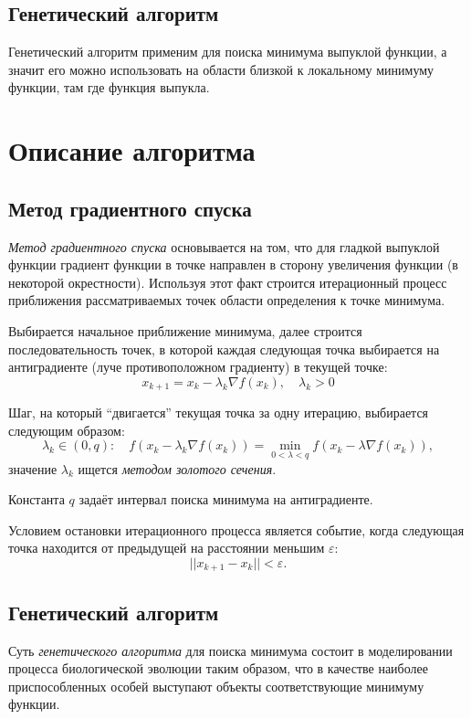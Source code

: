 \documentclass[10pt,a4paper,titlepage]{article}
\begin{document}
\subsection{Генетический алгоритм}
Генетический алгоритм применим для поиска минимума выпуклой функции, 
а значит его можно использовать на области близкой к локальному минимуму функции, 
там где функция выпукла.

\section{Описание алгоритма}
\subsection{Метод градиентного спуска}

\textit{Метод градиентного спуска} основывается на том, что для гладкой выпуклой функции градиент функции в точке направлен
в сторону увеличения функции (в некоторой окрестности).
Используя этот факт строится итерационный процесс приближения рассматриваемых точек области определения 
к точке минимума.

Выбирается начальное приближение минимума, далее строится последовательность точек,
в которой каждая следующая точка выбирается на антиградиенте (луче противоположном градиенту) в текущей точке:
$$ x_{k+1} = x_k - \lambda_k \nabla f(x_k), \quad \lambda_k > 0 $$

Шаг, на который ``двигается'' текущая точка за одну итерацию, выбирается следующим образом:
$$
  \lambda_k \in (0, q)\!: 
    \quad f(x_k - \lambda_k \nabla f(x_k)) = \min\limits_{0 < \lambda < q} f(x_k - \lambda \nabla f(x_k)),
$$
значение $\lambda_k$ ищется \textit{методом золотого сечения}.

Константа $q$ задаёт интервал поиска минимума на антиградиенте.

Условием остановки итерационного процесса является событие, когда следующая точка находится от предыдущей 
на расстоянии меньшим $\varepsilon$:
$$ || x_{k+1} - x_k || < \varepsilon. $$ %


\subsection{Генетический алгоритм}
Суть \textit{генетического алгоритма} для поиска минимума состоит в моделировании процесса биологической эволюции таким образом, 
что в качестве наиболее приспособленных особей выступают объекты соответствующие минимуму функции.
\end{document}

